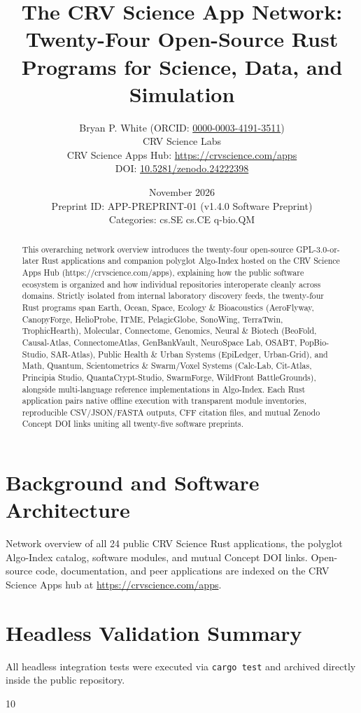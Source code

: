 \documentclass[10pt,letterpaper]{article}
\title{\textbf{The CRV Science App Network: Twenty-Four Open-Source Rust Programs for Science, Data, and Simulation}}
\author{Bryan P. White (ORCID: \href{https://orcid.org/0000-0003-4191-3511}{0000-0003-4191-3511}) \\ CRV Science Labs \\ \small CRV Science Apps Hub: \url{https://crvscience.com/apps} \\ \small DOI: \href{https://doi.org/10.5281/zenodo.24222398}{10.5281/zenodo.24222398}}
\date{November 2026 \\ \small Preprint ID: APP-PREPRINT-01 (v1.4.0 Software Preprint) \\ \small Categories: cs.SE \textbullet{} cs.CE \textbullet{} q-bio.QM}
\begin{document}
\maketitle

\begin{abstract}
This overarching network overview introduces the twenty-four open-source GPL-3.0-or-later Rust applications and companion polyglot Algo-Index hosted on the CRV Science Apps Hub (https://crvscience.com/apps), explaining how the public software ecosystem is organized and how individual repositories interoperate cleanly across domains. Strictly isolated from internal laboratory discovery feeds, the twenty-four Rust programs span Earth, Ocean, Space, Ecology \& Bioacoustics (AeroFlyway, CanopyForge, HelioProbe, ITME, PelagicGlobe, SonoWing, TerraTwin, TrophicHearth), Molecular, Connectome, Genomics, Neural \& Biotech (BeoFold, Causal-Atlas, ConnectomeAtlas, GenBankVault, NeuroSpace Lab, OSABT, PopBio-Studio, SAR-Atlas), Public Health \& Urban Systems (EpiLedger, Urban-Grid), and Math, Quantum, Scientometrics \& Swarm/Voxel Systems (Calc-Lab, Cit-Atlas, Principia Studio, QuantaCrypt-Studio, SwarmForge, WildFront BattleGrounds), alongside multi-language reference implementations in Algo-Index. Each Rust application pairs native offline execution with transparent module inventories, reproducible CSV/JSON/FASTA outputs, CFF citation files, and mutual Zenodo Concept DOI links uniting all twenty-five software preprints.
\end{abstract}

\section{Background and Software Architecture}
Network overview of all 24 public CRV Science Rust applications, the polyglot Algo-Index catalog, software modules, and mutual Concept DOI links. Open-source code, documentation, and peer applications are indexed on the CRV Science Apps hub at \url{https://crvscience.com/apps}.

\section{Headless Validation Summary}
All headless integration tests were executed via \texttt{cargo test} and archived directly inside the public repository.

\begin{thebibliography}{10}

\end{thebibliography}
\end{document}
